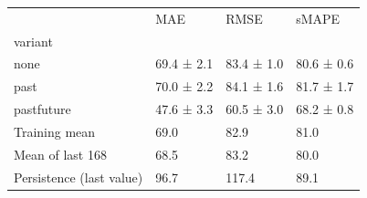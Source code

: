 \begin{tabular}{llll}
\toprule
 & MAE & RMSE & sMAPE \\
variant &  &  &  \\
\midrule
none & 69.4 ± 2.1 & 83.4 ± 1.0 & 80.6 ± 0.6 \\
past & 70.0 ± 2.2 & 84.1 ± 1.6 & 81.7 ± 1.7 \\
pastfuture & 47.6 ± 3.3 & 60.5 ± 3.0 & 68.2 ± 0.8 \\
Training mean & 69.0 & 82.9 & 81.0 \\
Mean of last 168 & 68.5 & 83.2 & 80.0 \\
Persistence (last value) & 96.7 & 117.4 & 89.1 \\
\bottomrule
\end{tabular}
